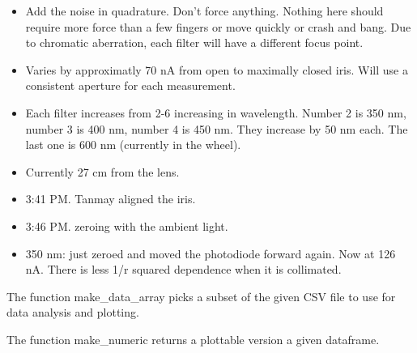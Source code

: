 \documentclass[11pt]{article}
\begin{document}
\begin{itemize}
\item Add the noise in quadrature. Don't force anything. Nothing here should require more force than a few fingers or move quickly or crash and bang. Due to chromatic aberration, each filter will have a different focus point. 
\item Varies by approximatly 70 nA from open to maximally closed iris. Will use a consistent aperture for each measurement. 
\item Each filter increases from 2-6 increasing in wavelength. Number 2 is 350 nm, number 3 is 400 nm, number 4 is 450 nm. They increase by 50 nm each. The last one is 600 nm (currently in the wheel). 
\item Currently 27 cm from the lens.
\item 3:41 PM. Tanmay aligned the iris. 
\item 3:46 PM. zeroing with the ambient light.
\item 350 nm: just zeroed and moved the photodiode forward again. Now at 126 nA. There is less 1/r squared dependence when it is collimated.  


\end{itemize}

    The function make\_data\_array picks a subset of the given CSV file to
use for data analysis and plotting.

The function make\_numeric returns a plottable version a given
dataframe.
\end{document}
